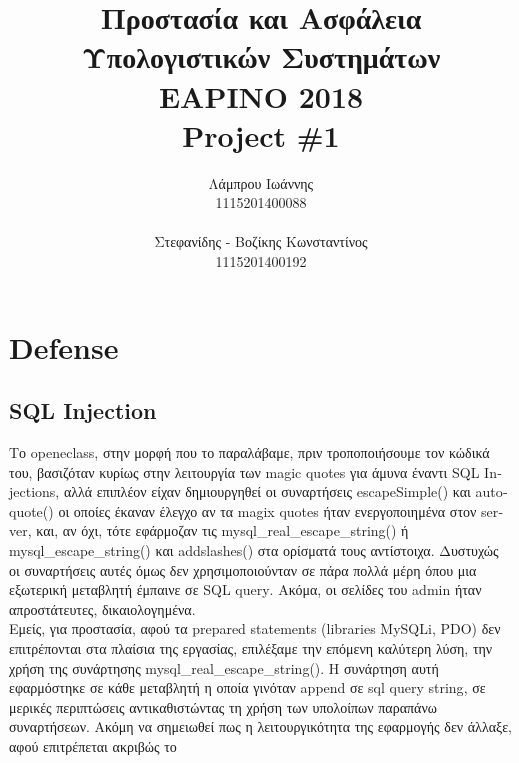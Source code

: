 \documentclass{article}
\begin{document}
\title{\vspace{-3.5cm}\textbf{Προστασία και Ασφάλεια Υπολογιστικών Συστημάτων \\ΕΑΡΙΝΟ 2018\\ \textlatin{Project \#}1}}
\author{Λάμπρου Ιωάννης \\1115201400088\\\\ Στεφανίδης - Βοζίκης Κωνσταντίνος \\1115201400192}

\maketitle
\section*{\textlatin{Defense}}
\subsection*{\textlatin{SQL Injection}}
Το \textlatin{openeclass}, στην μορφή που το παραλάβαμε, πριν τροποποιήσουμε τον κώδικά του, 
βασιζόταν κυρίως στην λειτουργία των \textlatin{magic quotes} για άμυνα έναντι \textlatin{SQL Injections},
αλλά επιπλέον είχαν δημιουργηθεί οι συναρτήσεις \textlatin{escapeSimple()} και \textlatin{autoquote()} οι
οποίες έκαναν έλεγχο αν τα \textlatin{magix quotes} ήταν ενεργοποιημένα στον \textlatin{server}, και, αν
όχι, τότε εφάρμοζαν τις \textlatin{mysql\_real\_escape\_string()} ή \textlatin{mysql\_escape\_string()} και
\textlatin{addslashes()} στα ορίσματά τους αντίστοιχα. Δυστυχώς οι συναρτήσεις αυτές όμως δεν
χρησιμοποιούνταν σε πάρα πολλά μέρη όπου μια εξωτερική μεταβλητή
έμπαινε σε \textlatin{SQL query}. Ακόμα, οι σελίδες του \textlatin{admin} ήταν απροστάτευτες, δικαιολογημένα.\\
Εμείς, για προστασία, αφού τα \textlatin{prepared statements (libraries MySQLi, PDO)} δεν επιτρέπονται στα
πλαίσια της εργασίας, επιλέξαμε την επόμενη καλύτερη λύση, την χρήση της συνάρτησης
\textlatin{mysql\_real\_escape\_string()}.
Η συνάρτηση αυτή εφαρμόστηκε σε κάθε μεταβλητή η οποία γινόταν \textlatin{append}
σε \textlatin{sql query string}, σε μερικές περιπτώσεις αντικαθιστώντας τη χρήση των υπολοίπων παραπάνω
συναρτήσεων. Ακόμη να σημειωθεί πως η λειτουργικότητα της εφαρμογής δεν άλλαξε, αφού επιτρέπεται ακριβώς το
\end{document}
